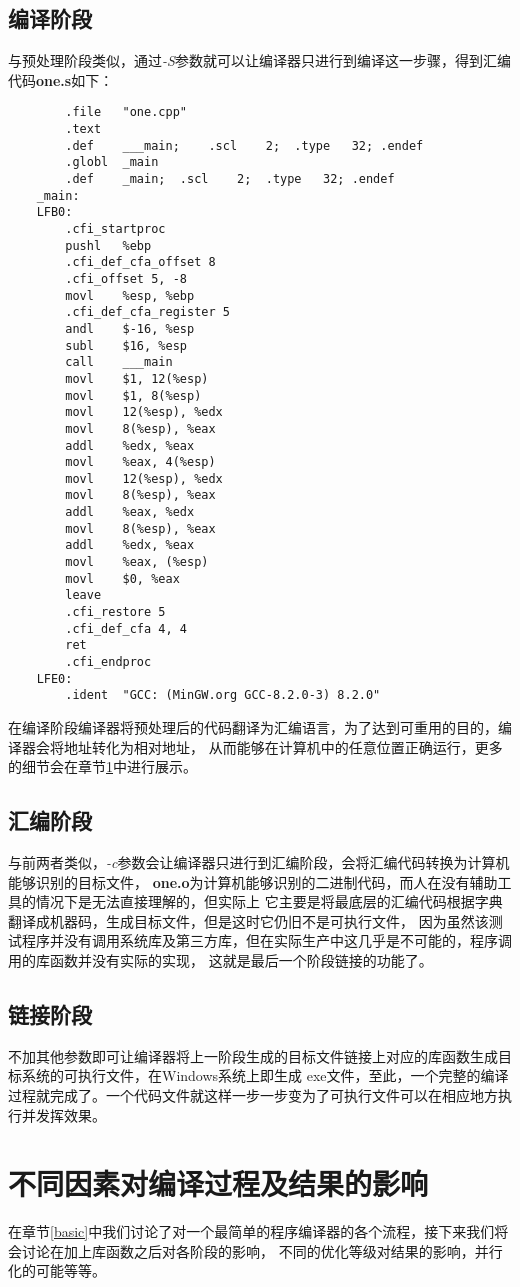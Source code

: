 \documentclass[UTF8]{ctexart}
\begin{document}
    \subsection{编译阶段}
    与预处理阶段类似，通过\emph{-S}参数就可以让编译器只进行到编译这一步骤，得到汇编代码\textbf{one.s}如下：
    \begin{verbatim}
        .file	"one.cpp"
        .text
        .def	___main;	.scl	2;	.type	32;	.endef
        .globl	_main
        .def	_main;	.scl	2;	.type	32;	.endef
    _main:
    LFB0:
        .cfi_startproc
        pushl	%ebp
        .cfi_def_cfa_offset 8
        .cfi_offset 5, -8
        movl	%esp, %ebp
        .cfi_def_cfa_register 5
        andl	$-16, %esp
        subl	$16, %esp
        call	___main
        movl	$1, 12(%esp)
        movl	$1, 8(%esp)
        movl	12(%esp), %edx
        movl	8(%esp), %eax
        addl	%edx, %eax
        movl	%eax, 4(%esp)
        movl	12(%esp), %edx
        movl	8(%esp), %eax
        addl	%eax, %edx
        movl	8(%esp), %eax
        addl	%edx, %eax
        movl	%eax, (%esp)
        movl	$0, %eax
        leave
        .cfi_restore 5
        .cfi_def_cfa 4, 4
        ret
        .cfi_endproc
    LFE0:
        .ident	"GCC: (MinGW.org GCC-8.2.0-3) 8.2.0"    
    \end{verbatim}
    在编译阶段编译器将预处理后的代码翻译为汇编语言，为了达到可重用的目的，编译器会将地址转化为相对地址，
    从而能够在计算机中的任意位置正确运行，更多的细节会在章节\ref{influence}中进行展示。
    \subsection{汇编阶段}
    与前两者类似，\emph{-c}参数会让编译器只进行到汇编阶段，会将汇编代码转换为计算机能够识别的目标文件，
    \textbf{one.o}为计算机能够识别的二进制代码，而人在没有辅助工具的情况下是无法直接理解的，但实际上
    它主要是将最底层的汇编代码根据字典翻译成机器码，生成目标文件，但是这时它仍旧不是可执行文件，
    因为虽然该测试程序并没有调用系统库及第三方库，但在实际生产中这几乎是不可能的，程序调用的库函数并没有实际的实现，
    这就是最后一个阶段链接的功能了。
    \subsection{链接阶段}
    不加其他参数即可让编译器将上一阶段生成的目标文件链接上对应的库函数生成目标系统的可执行文件，在Windows系统上即生成
    exe文件，至此，一个完整的编译过程就完成了。一个代码文件就这样一步一步变为了可执行文件可以在相应地方执行并发挥效果。
    \section{不同因素对编译过程及结果的影响}\label{influence}
    在章节\ref{basic}中我们讨论了对一个最简单的程序编译器的各个流程，接下来我们将会讨论在加上库函数之后对各阶段的影响，
    不同的优化等级对结果的影响，并行化的可能等等。
\end{document}
